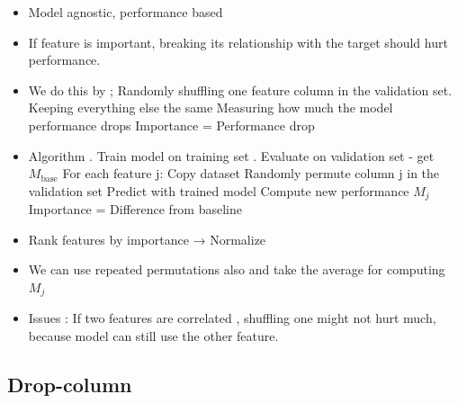 \documentclass[10pt,a4paper]{article}
\begin{document}
	\begin{itemize}
		\item Model agnostic, performance based
		\item If feature is important, breaking its relationship with the target should hurt performance.
		\item We do this by ;
			\subitem Randomly shuffling one feature column in the validation set.
			\subitem Keeping everything else the same
			\subitem Measuring how much the model performance drops
			\subitem Importance = Performance drop
		\item Algorithm
			. Train model on training set
			. Evaluate on validation set - get $M_{\text{base}}$
			\subitem For each feature j:
				\subsubitem Copy dataset
				\subsubitem Randomly permute column j in the validation set
				\subsubitem Predict with trained model
			\subitem Compute new performance $M_j$
			\subitem Importance = Difference from baseline
		\item Rank features by importance → Normalize
		\item We can use repeated permutations also and take the average for computing $M_j$
		\item Issues : If two features are correlated , shuffling one might not hurt much, because model can still use the other feature.
	\end{itemize}

	\subsection{Drop-column}
\end{document}
